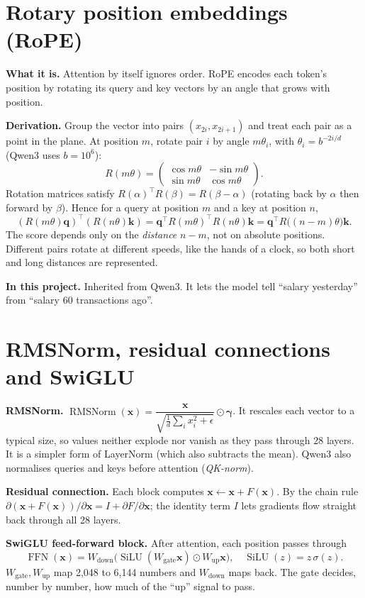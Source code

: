 \documentclass[10pt,a4paper]{article}
\newcommand{\what}[1]{\par\textbf{What it is.} #1}
\newcommand{\here}[1]{\par\textbf{In this project.} #1}
\newcommand{\deriv}{\par\textbf{Derivation.} }
\begin{document}
\section{Rotary position embeddings (RoPE)}
\what{Attention by itself ignores order. RoPE encodes each token's position by rotating its query and key vectors by an angle that grows with position.}
\deriv Group the vector into pairs $(x_{2i},x_{2i+1})$ and treat each pair as a point in the plane. At position $m$, rotate pair $i$ by angle $m\theta_i$, with $\theta_i=b^{-2i/d}$ (Qwen3 uses $b=10^6$):
\[R(m\theta)=\begin{pmatrix}\cos m\theta&-\sin m\theta\\ \sin m\theta&\cos m\theta\end{pmatrix}.\]
Rotation matrices satisfy $R(\alpha)^\top R(\beta)=R(\beta-\alpha)$ (rotating back by $\alpha$ then forward by $\beta$). Hence for a query at position $m$ and a key at position $n$,
\[(R(m\theta)\mathbf{q})^\top(R(n\theta)\mathbf{k})=\mathbf{q}^\top R(m\theta)^\top R(n\theta)\mathbf{k}=\mathbf{q}^\top R\big((n-m)\theta\big)\mathbf{k}.\]
The score depends only on the \emph{distance} $n-m$, not on absolute positions. Different pairs rotate at different speeds, like the hands of a clock, so both short and long distances are represented.
\here{Inherited from Qwen3. It lets the model tell ``salary yesterday'' from ``salary 60 transactions ago''.}

\section{RMSNorm, residual connections and SwiGLU}\label{sec:swiglu}
\textbf{RMSNorm.} $\operatorname{RMSNorm}(\mathbf{x})=\dfrac{\mathbf{x}}{\sqrt{\frac1d\sum_ix_i^2+\epsilon}}\odot\boldsymbol\gamma$. It rescales each vector to a typical size, so values neither explode nor vanish as they pass through 28 layers. It is a simpler form of LayerNorm (which also subtracts the mean). Qwen3 also normalises queries and keys before attention (\emph{QK-norm}).

\textbf{Residual connection.} Each block computes $\mathbf{x}\leftarrow\mathbf{x}+F(\mathbf{x})$. By the chain rule $\partial(\mathbf{x}+F(\mathbf{x}))/\partial\mathbf{x}=I+\partial F/\partial\mathbf{x}$; the identity term $I$ lets gradients flow straight back through all 28 layers.

\textbf{SwiGLU feed-forward block.} After attention, each position passes through
\[\operatorname{FFN}(\mathbf{x})=W_{\text{down}}\big(\operatorname{SiLU}(W_{\text{gate}}\mathbf{x})\odot W_{\text{up}}\mathbf{x}\big),\quad\operatorname{SiLU}(z)=z\,\sigma(z).\]
$W_{\text{gate}},W_{\text{up}}$ map 2,048 to 6,144 numbers and $W_{\text{down}}$ maps back. The gate decides, number by number, how much of the ``up'' signal to pass.
\end{document}
